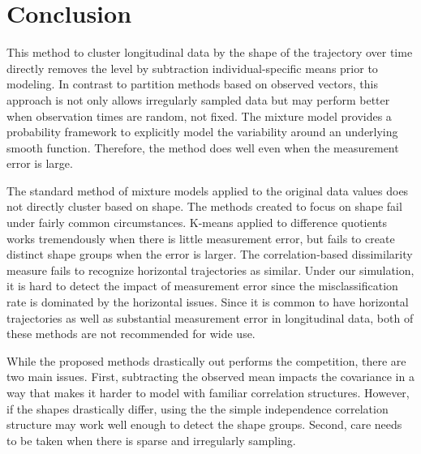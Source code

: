 \documentclass[12pt]{article}
\begin{document}
\section{Conclusion}
This method to cluster longitudinal data by the shape of the trajectory over time directly removes the level by subtraction individual-specific means prior to modeling. In contrast to partition methods based on observed vectors, this approach is not only allows irregularly sampled data but may perform better when observation times are random, not fixed. The mixture model provides a probability framework to explicitly model the variability around an underlying smooth function. Therefore, the method does well even when the measurement error is large. 

The standard method of mixture models applied to the original data values does not directly cluster based on shape. The methods created to focus on shape fail under fairly common circumstances. K-means applied to difference quotients works tremendously when there is little measurement error, but fails to create distinct shape groups when the error is larger. The correlation-based dissimilarity measure fails to recognize horizontal trajectories as similar. Under our simulation, it is hard to detect the impact of measurement error since the misclassification rate is dominated by the horizontal issues. Since it is common to have horizontal trajectories as well as substantial measurement error in longitudinal data, both of these methods are not recommended for wide use. 

While the proposed methods drastically out performs the competition, there are two main issues. First, subtracting the observed mean impacts the covariance in a way that makes it harder to model with familiar correlation structures. However, if the shapes drastically differ, using the the simple independence correlation structure may work well enough to detect the shape groups. Second, care needs to be taken when there is sparse and irregularly sampling. 

\printbibliography
\end{document}

